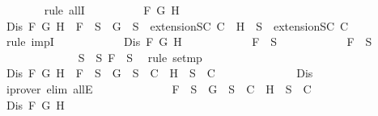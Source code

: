 \begin{isabellebody}
\ \ \ \ \ \ \isamarkupfalse%
\ {\isacharparenleft}rule\ allI{\isacharparenright}{\isacharplus}\isanewline
\ \ \ \ \ \ \ \ \isamarkupfalse%
\ F\ G\ H\isanewline
\ \ \ \ \ \ \ \ \isamarkupfalse%
\ {\isachardoublequoteopen}Dis\ F\ G\ H\ {\isasymlongrightarrow}\ F\ {\isasymin}\ S{\isacharprime}\ {\isasymlongrightarrow}\ {\isacharbraceleft}G{\isacharbraceright}\ {\isasymunion}\ S{\isacharprime}\ {\isasymin}\ {\isacharparenleft}extensionSC\ C{\isacharparenright}\ {\isasymor}\ {\isacharbraceleft}H{\isacharbraceright}\ {\isasymunion}\ S{\isacharprime}\ {\isasymin}\ {\isacharparenleft}extensionSC\ C{\isacharparenright}{\isachardoublequoteclose}\isanewline
\ \ \ \ \ \ \ \ \isamarkupfalse%
\ {\isacharparenleft}rule\ impI{\isacharparenright}{\isacharplus}\isanewline
\ \ \ \ \ \ \ \ \ \ \isamarkupfalse%
\ {\isachardoublequoteopen}Dis\ F\ G\ H{\isachardoublequoteclose}\isanewline
\ \ \ \ \ \ \ \ \ \ \isamarkupfalse%
\ {\isachardoublequoteopen}F\ {\isasymin}\ S{\isacharprime}{\isachardoublequoteclose}\isanewline
\ \ \ \ \ \ \ \ \ \ \isamarkupfalse%
\ {\isachardoublequoteopen}F\ {\isasymin}\ S{\isachardoublequoteclose}\isanewline
\ \ \ \ \ \ \ \ \ \ \ \ \isamarkupfalse%
\ {\isacartoucheopen}S{\isacharprime}\ {\isasymsubseteq}\ S{\isacartoucheclose}\ {\isacartoucheopen}F\ {\isasymin}\ S{\isacharprime}{\isacartoucheclose}\ \isamarkupfalse%
\ {\isacharparenleft}rule\ set{\isacharunderscore}mp{\isacharparenright}\isanewline
\ \ \ \ \ \ \ \ \ \ \isamarkupfalse%
\ {\isachardoublequoteopen}Dis\ F\ G\ H\ {\isasymlongrightarrow}\ F\ {\isasymin}\ S\ {\isasymlongrightarrow}\ {\isacharbraceleft}G{\isacharbraceright}\ {\isasymunion}\ S\ {\isasymin}\ C\ {\isasymor}\ {\isacharbraceleft}H{\isacharbraceright}\ {\isasymunion}\ S\ {\isasymin}\ C{\isachardoublequoteclose}\isanewline
\ \ \ \ \ \ \ \ \ \ \ \ \isamarkupfalse%
\ Dis\ \isamarkupfalse%
\ {\isacharparenleft}iprover\ elim{\isacharcolon}\ allE{\isacharparenright}\isanewline
\ \ \ \ \ \ \ \ \ \ \isamarkupfalse%
\ \isamarkupfalse%
\ {\isachardoublequoteopen}F\ {\isasymin}\ S\ {\isasymlongrightarrow}\ {\isacharbraceleft}G{\isacharbraceright}\ {\isasymunion}\ S\ {\isasymin}\ C\ {\isasymor}\ {\isacharbraceleft}H{\isacharbraceright}\ {\isasymunion}\ S\ {\isasymin}\ C{\isachardoublequoteclose}\isanewline
\ \ \ \ \ \ \ \ \ \ \ \ \isamarkupfalse%
\ {\isacartoucheopen}Dis\ F\ G\ H{\isacartoucheclose}\ \isamarkupfalse%

\end{isabellebody}
